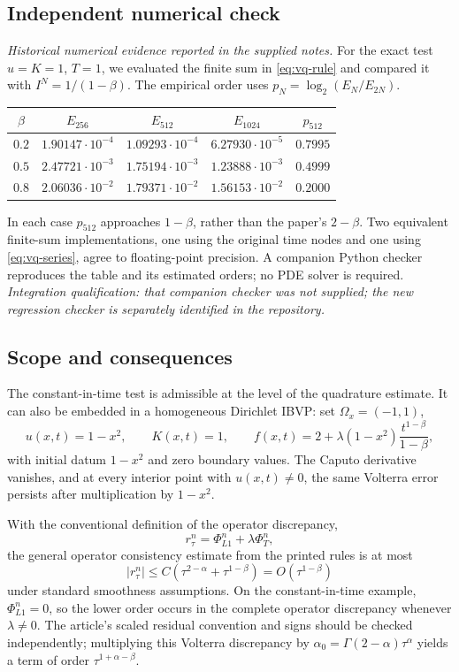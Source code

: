 \documentclass[11pt]{amsart}
\numberwithin{equation}{section}
\theoremstyle{remark}
\newcommand{\abs}[1]{\left\lvert #1\right\rvert}
\begin{document}
\subsection{Independent numerical check}
\textit{Historical numerical evidence reported in the supplied notes.}
For the exact test $u=K=1$, $T=1$, we evaluated the finite sum in
\eqref{eq:vq-rule} and compared it with $I^N=1/(1-\beta)$. The empirical
order uses $p_N=\log_2(E_N/E_{2N})$.
\begin{center}
\begin{tabular}{@{}ccccc@{}}
\toprule
$\beta$ & $E_{256}$ & $E_{512}$ & $E_{1024}$ & $p_{512}$\\
\midrule
$0.2$ & $1.90147\cdot10^{-4}$ & $1.09293\cdot10^{-4}$ & $6.27930\cdot10^{-5}$ & $0.7995$\\
$0.5$ & $2.47721\cdot10^{-3}$ & $1.75194\cdot10^{-3}$ & $1.23888\cdot10^{-3}$ & $0.4999$\\
$0.8$ & $2.06036\cdot10^{-2}$ & $1.79371\cdot10^{-2}$ & $1.56153\cdot10^{-2}$ & $0.2000$\\
\bottomrule
\end{tabular}
\end{center}
In each case $p_{512}$ approaches $1-\beta$, rather than the paper's
$2-\beta$. Two equivalent finite-sum implementations, one using the original
time nodes and one using \eqref{eq:vq-series}, agree to floating-point
precision. A companion Python checker reproduces the table and its estimated
orders; no PDE solver is required.
\textit{Integration qualification: that companion checker was not supplied;
the new regression checker is separately identified in the repository.}

\subsection{Scope and consequences}
The constant-in-time test is admissible at the level of the quadrature
estimate. It can also be embedded in a homogeneous Dirichlet IBVP: set
$\Omega_x=(-1,1)$,
\[
u(x,t)=1-x^2,\qquad K(x,t)=1,\qquad
f(x,t)=2+\lambda(1-x^2)\frac{t^{1-\beta}}{1-\beta},
\]
with initial datum $1-x^2$ and zero boundary values. The Caputo derivative
vanishes, and at every interior point with $u(x,t)\neq0$, the same Volterra
error persists after multiplication by $1-x^2$.

With the conventional definition of the operator discrepancy,
\[
r_\tau^n=\Phi_{L1}^n+\lambda\Phi_T^n,
\]
the general operator consistency estimate from the printed rules is at most
\[
\abs{r_\tau^n}\leq C(\tau^{2-\alpha}+\tau^{1-\beta})=O(\tau^{1-\beta})
\]
under standard smoothness assumptions. On the constant-in-time example,
$\Phi_{L1}^n=0$, so the lower order occurs in the complete operator
discrepancy whenever $\lambda\neq0$. The article's scaled residual convention
and signs should be checked independently; multiplying this Volterra
discrepancy by $\alpha_0=\Gamma(2-\alpha)\tau^\alpha$ yields a term of order
$\tau^{1+\alpha-\beta}$.
\end{document}
